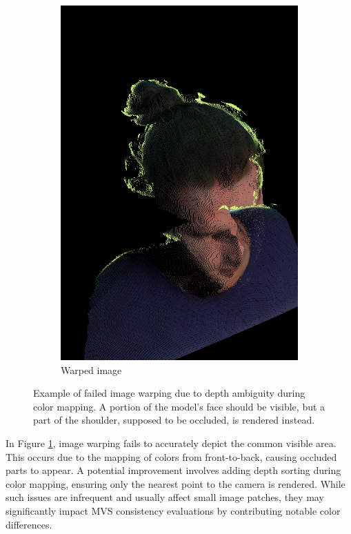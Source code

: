\begin{figure}[H]
\begin{subfigure}{0.3\linewidth}
		\includegraphics[width=\textwidth]{Figures/failed/depth_reprojection/color_intersection_0.png}
		\caption{Warped image}
	\end{subfigure}
	\caption{Example of failed image warping due to depth ambiguity during color mapping. A portion of the model's face should be visible, but a part of the shoulder, supposed to be occluded, is rendered instead.}
	\label{fig:failed_warping}
\end{figure}

In Figure \ref{fig:failed_warping}, image warping fails to accurately depict the common visible area. This occurs due to the mapping of colors from front-to-back, causing occluded parts to appear. A potential improvement involves adding depth sorting during color mapping, ensuring only the nearest point to the camera is rendered. While such issues are infrequent and usually affect small image patches, they may significantly impact MVS consistency evaluations by contributing notable color differences.


